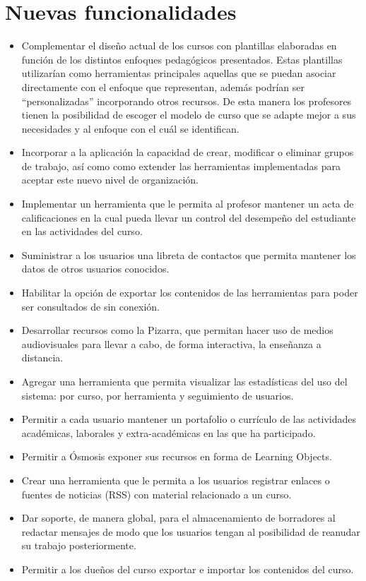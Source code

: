 \section*{Nuevas funcionalidades}
\begin{itemize}
	\item Complementar el diseño actual de los cursos con plantillas elaboradas en función de los distintos enfoques pedagógicos presentados. Estas plantillas utilizarían como herramientas principales aquellas que se puedan asociar directamente con el enfoque que representan, además podrían ser  ``personalizadas'' incorporando otros recursos. De esta manera los profesores tienen la posibilidad de escoger el modelo de curso que se adapte mejor a sus necesidades y al enfoque con el cuál se identifican.
	\item Incorporar a la aplicación la capacidad de crear, modificar o eliminar grupos de trabajo, así como como extender las herramientas implementadas para aceptar este nuevo nivel de organización.
	\item Implementar un herramienta que le permita al profesor mantener un acta de calificaciones en la cual pueda llevar un control del desempeño del estudiante en las actividades del curso.
	\item Suministrar a los usuarios una libreta de contactos que permita mantener los datos de otros usuarios conocidos.
	\item Habilitar la opción de exportar los contenidos de las herramientas para poder ser consultados de sin conexión.
	\item Desarrollar recursos como la Pizarra, que permitan hacer uso de medios audiovisuales para llevar a cabo, de forma interactiva, la enseñanza a distancia. 
	\item Agregar una herramienta que permita visualizar las estadísticas del uso del sistema: por curso, por herramienta y seguimiento de usuarios.
	\item Permitir a cada usuario mantener un portafolio o currículo de las actividades académicas, laborales y extra-académicas en las que ha participado.
	\item Permitir a Ósmosis exponer sus recursos en forma de Learning Objects.
	\item Crear una herramienta que le permita a los usuarios registrar enlaces o fuentes de noticias (RSS) con material relacionado a un curso.
	\item Dar soporte, de manera global, para el almacenamiento de borradores al redactar mensajes de modo que los usuarios tengan al posibilidad de reanudar su trabajo posteriormente.
	\item Permitir a los dueños del curso exportar e importar los contenidos del curso.
\end{itemize}

